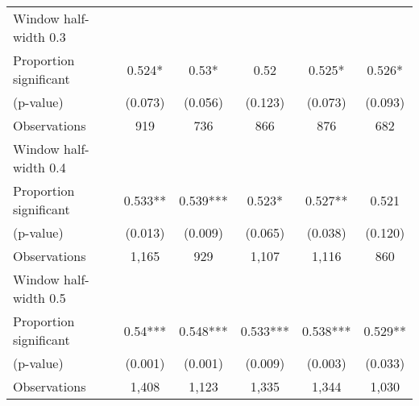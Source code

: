 \begin{tabular}{l*{5}{c}}
\hline
Window half-width 0.3\\

Proportion significant& 0.524* &  0.53* &  0.52 &  0.525* &  0.526*\\

(p-value) & (0.073) &  (0.056) &  (0.123) &  (0.073) &  (0.093)\\

Observations& 919 &  736 &  866 &  876 &  682\\

\hline
Window half-width 0.4\\

Proportion significant& 0.533** &  0.539*** &  0.523* &  0.527** &  0.521\\

(p-value) & (0.013) &  (0.009) &  (0.065) &  (0.038) &  (0.120)\\

Observations& 1,165 &  929 &  1,107 &  1,116 &  860\\

\hline
Window half-width 0.5\\

Proportion significant& 0.54*** &  0.548*** &  0.533*** &  0.538*** &  0.529**\\

(p-value) & (0.001) &  (0.001) &  (0.009) &  (0.003) &  (0.033)\\

Observations& 1,408 &  1,123 &  1,335 &  1,344 &  1,030\\

\hline\hline
\end{tabular}

